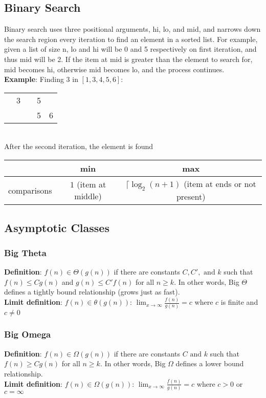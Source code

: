 \documentclass{article}
\begin{document}
\begin{spacing}{1.5}
\subsection{Binary Search}
\label{sec:binarysearch}
Binary search uses three positional arguments, hi, lo, and mid, and narrows down the search region every iteration to find an element in a sorted list. For example, given a list of size n, lo and hi will be 0 and 5 respectively on first iteration, and thus mid will be 2. If the item at mid is greater than the element to search for, mid becomes hi, otherwise mid becomes lo, and the process continues.\\
\textbf{Example}: Finding 3 in $[1,3,4,5,6]$:\\
\begin{tabular}{c|c|c|c|c}
     \color{red}{1} & 3 & \color{green}{4} & 5 & \color{blue}{6} \\
     \color{red}{1} & \color{green}{3} & \color{blue}{4} & 5 & 6 
\end{tabular}\\
After the second iteration, the element is found\\
\begin{tabular}{c|c|c}
     & min & max \\
     \hline
    comparisons & $1$ (item at middle) &  $\lceil{\log_{2}(n+1)}$ (item at ends or not present)
\end{tabular}
\subsection{Asymptotic Classes}
\label{sec:asymptotic}
\subsubsection{Big Theta}
\label{sec:theta}
\textbf{Definition}: $f(n) \in \Theta(g(n))$ if there are constants $C, C', \text{ and } k$ such that $f(n) \leq Cg(n)$ and $g(n) \leq C'f(n)$ for all $n \geq k$. In other words, Big $\Theta$ defines a tightly bound relationship (grows just as fast).\\
\textbf{Limit definition}: $f(n) \in \theta(g(n))$: $\lim_{x\to\infty} \frac{f(n)}{g(n)} = c$ where $c$ is finite and $c \neq 0$
\subsubsection{Big Omega}
\label{sec:omega}
\textbf{Definition}: $f(n) \in \Omega(g(n))$ if there are constants $C \text{ and } k$ such that $f(n) \geq Cg(n)$ for all $n \geq k$. In other words, Big $\Omega$ defines a lower bound relationship.\\
\textbf{Limit definition}: $f(n) \in \Omega(g(n))$: $\lim_{x\to\infty} \frac{f(n)}{g(n)} = c$ where $c > 0$ or $c = \infty$

\end{spacing}
\end{document}
